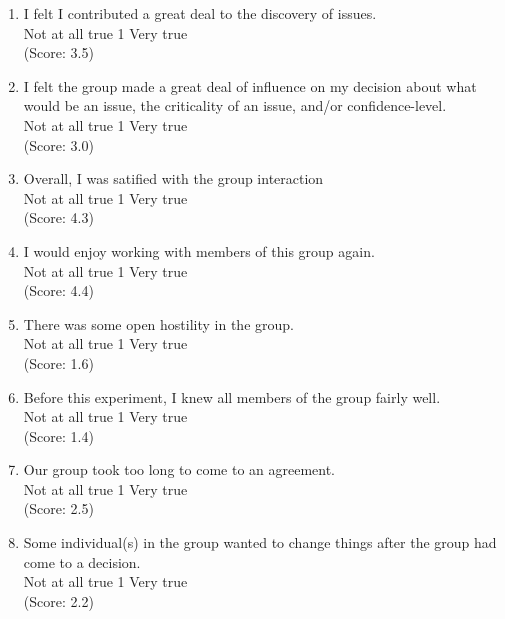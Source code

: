 \begin{enumerate}
\item I felt I contributed a great deal to the discovery of issues.
\\
Not at all true \hfill 1     \hfill Very true\\
(Score: 3.5)

\item I felt the group made a great deal of influence on my decision
about what would be an issue, the criticality of an issue, and/or confidence-level.
\\
Not at all true \hfill 1     \hfill Very true\\
(Score: 3.0)

\item Overall, I was satified with the group interaction
\\
Not at all true \hfill 1     \hfill Very true\\
(Score: 4.3)

\item I would enjoy working with members of this group again.
\\
Not at all true \hfill 1     \hfill Very true\\
(Score: 4.4)

\item There was some open hostility in the group.
\\
Not at all true \hfill 1     \hfill Very true\\
(Score: 1.6)

\item Before this experiment, I knew all members of the group fairly well. 
\\
Not at all true \hfill 1     \hfill Very true\\
(Score: 1.4)

\item Our group took too long to come to an agreement.
\\
Not at all true \hfill 1     \hfill Very true\\
(Score: 2.5)

\item Some individual(s) in the group wanted to change things after
the group had come to a decision.
\\
Not at all true \hfill 1     \hfill Very true\\
(Score: 2.2)


\end{enumerate}
